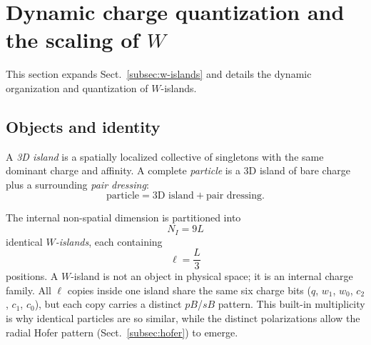 \documentclass{ijuc}
\begin{document}
\section{Dynamic charge quantization and the scaling of $W$}\label{sec:dynamic-charge-quantization}

This section expands Sect.~\ref{subsec:w-islands} and details the dynamic organization and quantization of $W$-islands.

\subsection{Objects and identity}

A \emph{3D island} is a spatially localized collective of singletons with the same dominant charge and affinity. A complete \emph{particle} is a 3D island of bare charge plus a surrounding \emph{pair dressing}:
\begin{equation}
\text{particle} = \text{3D island} + \text{pair dressing}.
\end{equation}

The internal non-spatial dimension is partitioned into
\begin{equation}
N_I = 9L
\end{equation}
identical \emph{$W$-islands}, each containing
\begin{equation}
\ell = \frac{L}{3}
\end{equation}
positions. A $W$-island is not an object in physical space; it is an internal charge family. All $\ell$ copies inside one island share the same six charge bits ($q$, $w_1$, $w_0$, $c_2$, $c_1$, $c_0$), but each copy carries a distinct $pB$/$sB$ pattern. This built-in multiplicity is why identical particles are so similar, while the distinct polarizations allow the radial Hofer pattern (Sect.~\ref{subsec:hofer}) to emerge.
\end{document}
